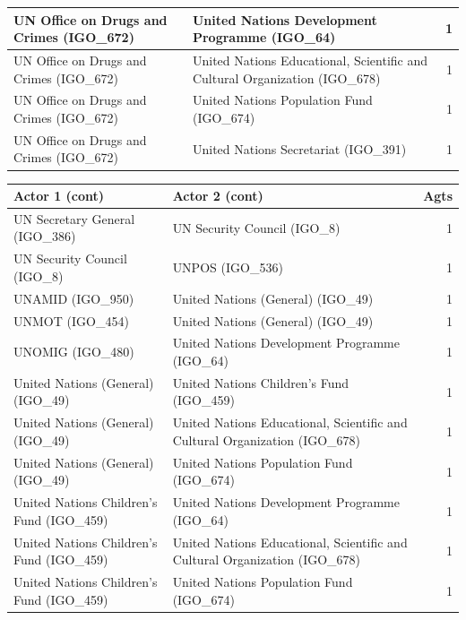 \documentclass{article}
\begin{document}
\begin{table}[H]
\begin{center}
\begin{tabularx}{\textwidth}{|X|X|r|}
\hline
UN Office on Drugs and Crimes (IGO\_672) & United Nations Development Programme (IGO\_64) & 1 \\
\hline
UN Office on Drugs and Crimes (IGO\_672) & United Nations Educational, Scientific and Cultural Organization (IGO\_678) & 1 \\
\hline
UN Office on Drugs and Crimes (IGO\_672) & United Nations Population Fund (IGO\_674) & 1 \\
\hline
UN Office on Drugs and Crimes (IGO\_672) & United Nations Secretariat (IGO\_391) & 1 \\
\hline
\end{tabularx}
\end{center}
\normalsize
\end{table}


\begin{table}[H]
\begin{center}
\small
\begin{tabularx}{\textwidth}{|X|X|r|}
    \hline
    \textbf{Actor 1 (cont)} & \textbf{Actor 2 (cont)} & \textbf{Agts} \\
    \hline
    \hline
UN Secretary General (IGO\_386) & UN Security Council (IGO\_8) & 1 \\
\hline
UN Security Council (IGO\_8) & UNPOS (IGO\_536) & 1 \\
\hline
UNAMID (IGO\_950) & United Nations (General) (IGO\_49) & 1 \\
\hline
UNMOT (IGO\_454) & United Nations (General) (IGO\_49) & 1 \\
\hline
UNOMIG (IGO\_480) & United Nations Development Programme (IGO\_64) & 1 \\
\hline
United Nations (General) (IGO\_49) & United Nations Children's Fund (IGO\_459) & 1 \\
\hline
United Nations (General) (IGO\_49) & United Nations Educational, Scientific and Cultural Organization (IGO\_678) & 1 \\
\hline
United Nations (General) (IGO\_49) & United Nations Population Fund (IGO\_674) & 1 \\
\hline
United Nations Children's Fund (IGO\_459) & United Nations Development Programme (IGO\_64) & 1 \\
\hline
United Nations Children's Fund (IGO\_459) & United Nations Educational, Scientific and Cultural Organization (IGO\_678) & 1 \\
\hline
United Nations Children's Fund (IGO\_459) & United Nations Population Fund (IGO\_674) & 1 \\
\hline

\end{tabularx}
\end{center}
\end{table}
\end{document}
